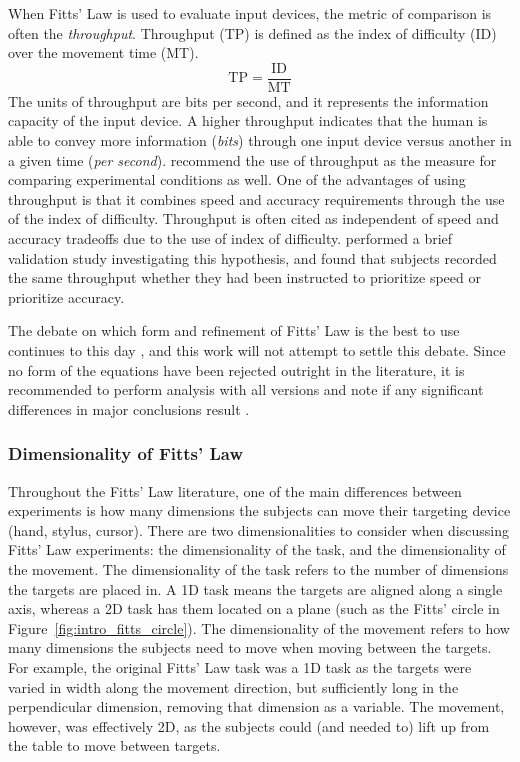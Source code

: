 When Fitts' Law is used to evaluate input devices, the metric of comparison is often the \emph{throughput}.
Throughput (TP) is defined as the index of difficulty (ID) over the movement time (MT).
\begin{equation}
    \mathrm{TP} = \frac{\text{ID}}{\text{MT}}
\end{equation}
The units of throughput are bits per second, and it represents the information capacity of the input device.
A higher throughput indicates that the human is able to convey more information (\emph{bits}) through one input device versus another in a given time (\emph{per second}).
\citet{soukoreff_towards_2004} recommend the use of throughput as the measure for comparing experimental conditions as well.
One of the advantages of using throughput is that it combines speed and accuracy requirements through the use of the index of difficulty.
Throughput is often cited as independent of speed and accuracy tradeoffs due to the use of index of difficulty.
\citet{mackenzie_fitts_2008} performed a brief validation study investigating this hypothesis, and found that subjects recorded the same throughput whether they had been instructed to prioritize speed or prioritize accuracy.

The debate on which form and refinement of Fitts' Law is the best to use continues to this day \citep{drewes_only_2010,hoffmann_which_2013}, and this work will not attempt to settle this debate.
Since no form of the equations have been rejected outright in the literature, it is recommended to perform analysis with all versions and note if any significant differences in major conclusions result \citep{soukoreff_towards_2004}.

\subsubsection{Dimensionality of Fitts' Law}\label{dimensionality-of-fitts-law}

Throughout the Fitts' Law literature, one of the main differences between experiments is how many dimensions the subjects can move their targeting device (hand, stylus, cursor).
There are two dimensionalities to consider when discussing Fitts' Law experiments: the dimensionality of the task, and the dimensionality of the movement.
The dimensionality of the task refers to the number of dimensions the targets are placed in.
A 1D task means the targets are aligned along a single axis, whereas a 2D task has them located on a plane (such as the Fitts' circle in Figure~\ref{fig:intro_fitts_circle}).
The dimensionality of the movement refers to how many dimensions the subjects need to move when moving between the targets.
For example, the original Fitts' Law task was a 1D task as the targets were varied in width along the movement direction, but sufficiently long in the perpendicular dimension, removing that dimension as a variable.
The movement, however, was effectively 2D, as the subjects could (and needed to) lift up from the table to move between targets.

